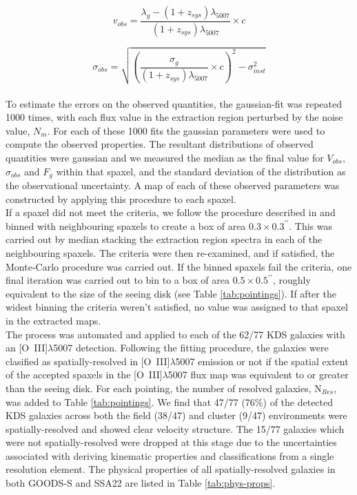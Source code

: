 \documentclass[fleqn,usenatbib]{mnras}
\begin{document}
\begin{equation}\label{eq:velocity_comp}
   v_{obs} = \frac{\lambda_{g} - (1 + z_{sys})\lambda_{5007}}{(1 + z_{sys})\lambda_{5007}} \times c
\end{equation}

\begin{equation}\label{eq:dispersion_comp}
   \sigma_{obs} = \sqrt{\left(\frac{\sigma_{g}}{(1 + z_{sys})\lambda_{5007}} \times c\right)^{2} - \sigma_{inst}^{2}}
\end{equation} \\


\noindent
To estimate the errors on the observed quantities, the gaussian-fit was repeated 1000 times, with each flux value in the extraction region perturbed by the noise value, $N_{m}$.
For each of these 1000 fits the gaussian parameters were used to compute the observed properties.
The resultant distributions of observed quantities were gaussian and we measured the median as the final value for $V_{obs}$, $\sigma_{obs}$ and $F_{g}$ within that spaxel, and the standard deviation of the distribution as the observational uncertainty.
A map of each of these observed parameters was constructed by applying this procedure to each spaxel. \\

\noindent
If a spaxel did not meet the criteria, we follow the procedure described in \cite{Stott2016} and binned with neighbouring spaxels to create a box of area $0.3\times0.3^{\prime\prime}$.
This was carried out by median stacking the extraction region spectra in each of the neighbouring spaxels.
The criteria were then re-examined, and if satisfied, the Monte-Carlo procedure was carried out. 
If the binned spaxels fail the criteria, one final iteration was carried out to bin to a box of area $0.5\times0.5^{\prime\prime}$, roughly equivalent to the size of the seeing disk (see Table \ref{tab:pointings}).
If after the widest binning the criteria weren't satisfied, no value was assigned to that spaxel in the extracted maps. \\

\noindent
The process was automated and applied to each of the 62/77 KDS galaxies with an [O~{\sc III}]$\lambda$5007 detection.
Following the fitting procedure, the galaxies were clasified as spatially-resolved in [O~{\sc III}]$\lambda$5007 emission or not if the spatial extent of the accepted spaxels in the [O~{\sc III}]$\lambda$5007 flux map was equivalent to or greater than the seeing disk.
For each pointing, the number of resolved galaxies, N$_{Res}$, was added to Table \ref{tab:pointings}.
We find that 47/77 (76\%) of the detected KDS galaxies across both the field (38/47) and cluster (9/47) environments were spatially-resolved and showed clear velocity structure.
The 15/77 galaxies which were not spatially-resolved were dropped at this stage due to the uncertainties associated with deriving kinematic properties and classifications from a single resolution element.
The physical properties of all spatially-resolved galaxies in both GOODS-S and SSA22 are listed in Table \ref{tab:phys-props}. \\ 
\end{document}
